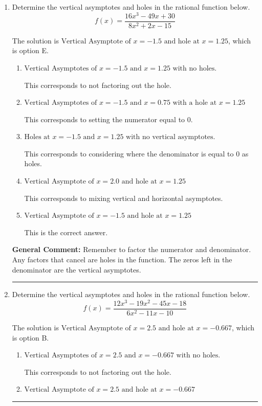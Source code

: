 \documentclass{extbook}[14pt]
\newcommand{\litem}[1]{\item #1

\rule{\textwidth}{0.4pt}}
\begin{document}
\begin{enumerate}\litem{
Determine the vertical asymptotes and holes in the rational function below.
\[ f(x) = \frac{16x^{3} -49 x + 30}{8x^{2} +2 x -15} \]

The solution is \( \text{Vertical Asymptote of } x = -1.5 \text{ and hole at } x = 1.25 \), which is option E.\begin{enumerate}[label=\Alph*.]
\item \( \text{Vertical Asymptotes of } x = -1.5 \text{ and } x = 1.25 \text{ with no holes.} \)

This corresponds to not factoring out the hole.
\item \( \text{Vertical Asymptotes of } x = -1.5 \text{ and } x = 0.75 \text{ with a hole at } x = 1.25 \)

This corresponds to setting the numerator equal to 0.
\item \( \text{Holes at } x = -1.5 \text{ and } x = 1.25 \text{ with no vertical asymptotes.} \)

This corresponds to considering where the denominator is equal to 0 as holes.
\item \( \text{Vertical Asymptote of } x = 2.0 \text{ and hole at } x = 1.25 \)

This corresponds to mixing vertical and horizontal asymptotes.
\item \( \text{Vertical Asymptote of } x = -1.5 \text{ and hole at } x = 1.25 \)

This is the correct answer.
\end{enumerate}

\textbf{General Comment:} Remember to factor the numerator and denominator. Any factors that cancel are holes in the function. The zeros left in the denominator are the vertical asymptotes.
}
\litem{
Determine the vertical asymptotes and holes in the rational function below.
\[ f(x) = \frac{12x^{3} -19 x^{2} -45 x -18}{6x^{2} -11 x -10} \]

The solution is \( \text{Vertical Asymptote of } x = 2.5 \text{ and hole at } x = -0.667 \), which is option B.\begin{enumerate}[label=\Alph*.]
\item \( \text{Vertical Asymptotes of } x = 2.5 \text{ and } x = -0.667 \text{ with no holes.} \)

This corresponds to not factoring out the hole.
\item \( \text{Vertical Asymptote of } x = 2.5 \text{ and hole at } x = -0.667 \)


\end{enumerate}}
\end{enumerate}
\end{document}
